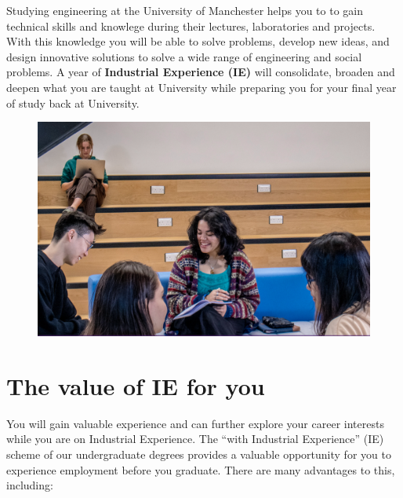 \documentclass[
]{book}
\begin{document}
Studying engineering at the University of Manchester helps you to to gain technical skills and knowlege during their lectures, laboratories and projects. With this knowledge you will be able to solve problems, develop new ideas, and design innovative solutions to solve a wide range of engineering and social problems. A year of \textbf{Industrial Experience (IE)} will consolidate, broaden and deepen what you are taught at University while preparing you for your final year of study back at University.

\begin{figure}

{\centering \includegraphics[width=1\linewidth]{images/manya} 

}

\end{figure}

\section{The value of IE for you}\label{value}

You will gain valuable experience and can further explore your career interests while you are on Industrial Experience. \citep{ucas} The ``with Industrial Experience'' (IE) scheme of our undergraduate degrees provides a valuable opportunity for you to experience employment before you graduate. There are many advantages to this, including:
\end{document}

